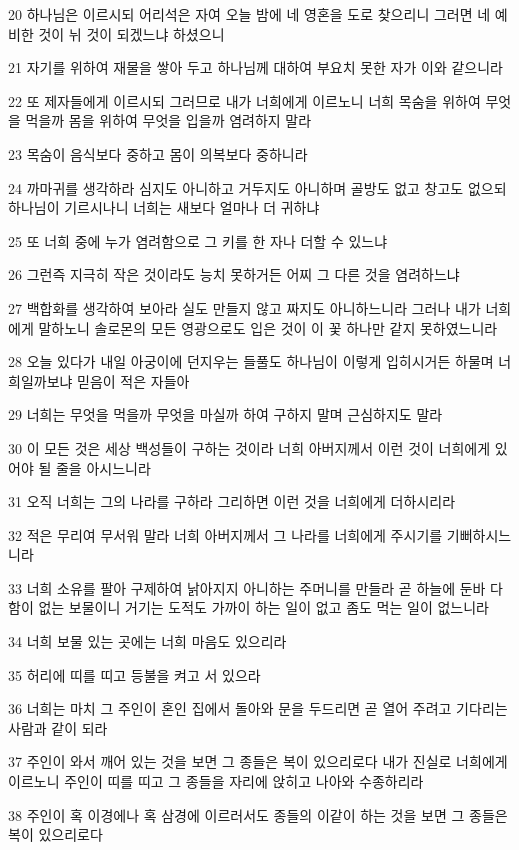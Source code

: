 \par 20 하나님은 이르시되 어리석은 자여 오늘 밤에 네 영혼을 도로 찾으리니 그러면 네 예비한 것이 뉘 것이 되겠느냐 하셨으니
\par 21 자기를 위하여 재물을 쌓아 두고 하나님께 대하여 부요치 못한 자가 이와 같으니라
\par 22 또 제자들에게 이르시되 그러므로 내가 너희에게 이르노니 너희 목숨을 위하여 무엇을 먹을까 몸을 위하여 무엇을 입을까 염려하지 말라
\par 23 목숨이 음식보다 중하고 몸이 의복보다 중하니라
\par 24 까마귀를 생각하라 심지도 아니하고 거두지도 아니하며 골방도 없고 창고도 없으되 하나님이 기르시나니 너희는 새보다 얼마나 더 귀하냐
\par 25 또 너희 중에 누가 염려함으로 그 키를 한 자나 더할 수 있느냐
\par 26 그런즉 지극히 작은 것이라도 능치 못하거든 어찌 그 다른 것을 염려하느냐
\par 27 백합화를 생각하여 보아라 실도 만들지 않고 짜지도 아니하느니라 그러나 내가 너희에게 말하노니 솔로몬의 모든 영광으로도 입은 것이 이 꽃 하나만 같지 못하였느니라
\par 28 오늘 있다가 내일 아궁이에 던지우는 들풀도 하나님이 이렇게 입히시거든 하물며 너희일까보냐 믿음이 적은 자들아
\par 29 너희는 무엇을 먹을까 무엇을 마실까 하여 구하지 말며 근심하지도 말라
\par 30 이 모든 것은 세상 백성들이 구하는 것이라 너희 아버지께서 이런 것이 너희에게 있어야 될 줄을 아시느니라
\par 31 오직 너희는 그의 나라를 구하라 그리하면 이런 것을 너희에게 더하시리라
\par 32 적은 무리여 무서워 말라 너희 아버지께서 그 나라를 너희에게 주시기를 기뻐하시느니라
\par 33 너희 소유를 팔아 구제하여 낡아지지 아니하는 주머니를 만들라 곧 하늘에 둔바 다함이 없는 보물이니 거기는 도적도 가까이 하는 일이 없고 좀도 먹는 일이 없느니라
\par 34 너희 보물 있는 곳에는 너희 마음도 있으리라
\par 35 허리에 띠를 띠고 등불을 켜고 서 있으라
\par 36 너희는 마치 그 주인이 혼인 집에서 돌아와 문을 두드리면 곧 열어 주려고 기다리는 사람과 같이 되라
\par 37 주인이 와서 깨어 있는 것을 보면 그 종들은 복이 있으리로다 내가 진실로 너희에게 이르노니 주인이 띠를 띠고 그 종들을 자리에 앉히고 나아와 수종하리라
\par 38 주인이 혹 이경에나 혹 삼경에 이르러서도 종들의 이같이 하는 것을 보면 그 종들은 복이 있으리로다
